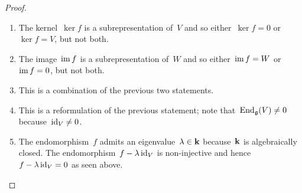 \begin{proof}
  \leavevmode
  \begin{enumerate}
    \item
      The kernel~$\ker f$ is a subrepresentation of~$V$ and so either~$\ker f = 0$ or~$\ker f = V$, but not both.
    \item
      The image~$\operatorname{im} f$ is a subrepresentation of~$W$ and so either~$\operatorname{im} f = W$ or~$\operatorname{im} f = 0$, but not both.
    \item
      This is a combination of the previous two statements.
    \item
      This is a reformulation of the previous statement;
      note that~$\operatorname{End}_{\mathfrak{g}}(V) \neq 0$ because~$\operatorname{id}_V \neq 0$.
    \item
      The endomorphism~$f$ admits an eigenvalue~$\lambda \in \mathbf{k}$ because~$\mathbf{k}$ is algebraically closed.
      The endomorphism~$f - \lambda \operatorname{id}_V$ is non-injective and hence~$f - \lambda \operatorname{id}_V = 0$ as seen above.
    \qedhere
  \end{enumerate}
\end{proof}










